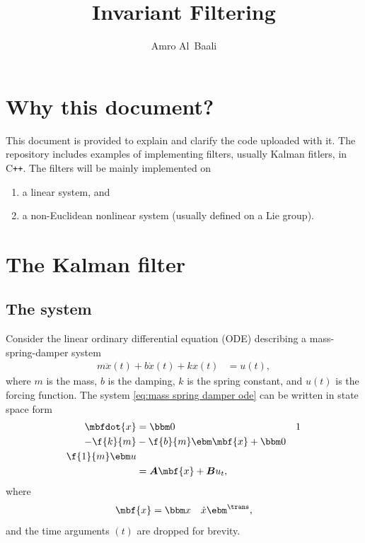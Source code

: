 \documentclass[nobib, nofonts, notoc]{tufte-handout}
\title{Invariant Filtering}
\author{Amro Al~Baali}
\newcommand{\cpp}{C\texttt{++}\xspace}
\begin{document}
    {    
        
        \tableofcontents
        \clearpage
    }

    \section{Why this document?}
    This document is provided to explain and clarify the code uploaded with it. The repository includes examples of implementing filters, usually Kalman fitlers, in \cpp. The filters will be mainly implemented on 
    \begin{enumerate}
        \item a linear system, and
        \item a non-Euclidean nonlinear system (usually defined on a Lie group).
    \end{enumerate}

    \section{The Kalman filter}
    \subsection{The system}
    Consider the linear ordinary differential equation (ODE) describing a mass-spring-damper system
    \begin{align}
        \label{eq:mass spring damper ode}
        m\ddot{x}(t) + b\dot{x}(t) + kx(t) &= u(t),
    \end{align}
    where $m$ is the mass, $b$ is the damping, $k$ is the spring constant, and $u(t)$ is the forcing function. The system \eqref{eq:mass spring damper ode} can be written in state space form
    \begin{align}
        \mbfdot{x} &= \bbm 0 & 1\\ -\f{k}{m} & -\f{b}{m} \ebm \mbf{x} + \bbm 0\\\f{1}{m} \ebm u\\
        &= \boldsymbol{A}\mbf{x} + \boldsymbol{B}u_{t},
    \end{align}
    where 
    \begin{align}
        \label{eq:DT linear kinematic model}
        \mbf{x} &= \bbm x & \dot{x} \ebm^{\trans},
    \end{align}
    and the time arguments $(t)$ are dropped for brevity.
\end{document}
